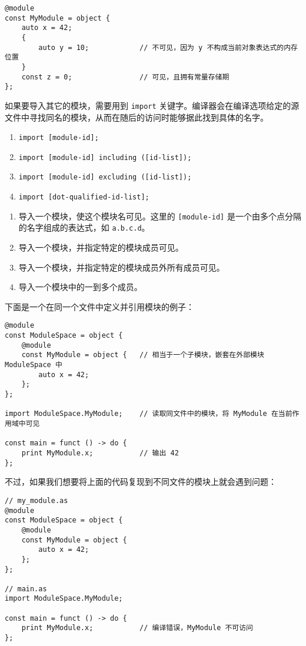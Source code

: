\begin{lstlisting}
@module
const MyModule = object {
	auto x = 42;
	{
		auto y = 10;			// 不可见，因为 y 不构成当前对象表达式的内存位置
	}
	const z = 0;				// 可见，且拥有常量存储期
};
\end{lstlisting}

如果要导入其它的模块，需要用到 \lstinline!import! 关键字。编译器会在编译选项给定的源文件中寻找同名的模块，从而在随后的访问时能够据此找到具体的名字。

\begin{grammar} \label{grm:import-statement}
\begin{enumerate}
	\item \lstinline!import [module-id];!
	\item \lstinline!import [module-id] including ([id-list]);!
	\item \lstinline!import [module-id] excluding ([id-list]);!
	\item \lstinline!import [dot-qualified-id-list];!
\end{enumerate}
\end{grammar}

\begin{enumerate}
	\item 导入一个模块，使这个模块名可见。这里的 \lstinline![module-id]! 是一个由多个点分隔的名字组成的表达式，如 \lstinline!a.b.c.d!。
	\item 导入一个模块，并指定特定的模块成员可见。
	\item 导入一个模块，并指定特定的模块成员外所有成员可见。
	\item 导入一个模块中的一到多个成员。
\end{enumerate}

下面是一个在同一个文件中定义并引用模块的例子：

\begin{lstlisting}
@module
const ModuleSpace = object {
    @module
	const MyModule = object {	// 相当于一个子模块，嵌套在外部模块 ModuleSpace 中
		auto x = 42;
	};
};

import ModuleSpace.MyModule;	// 读取同文件中的模块，将 MyModule 在当前作用域中可见

const main = funct () -> do {
	print MyModule.x;			// 输出 42
};
\end{lstlisting}

不过，如果我们想要将上面的代码复现到不同文件的模块上就会遇到问题：

\begin{lstlisting}
// my_module.as
@module
const ModuleSpace = object {
    @module
	const MyModule = object {
		auto x = 42;
	};
};

// main.as
import ModuleSpace.MyModule;

const main = funct () -> do {
	print MyModule.x;			// 编译错误，MyModule 不可访问
};
\end{lstlisting}

